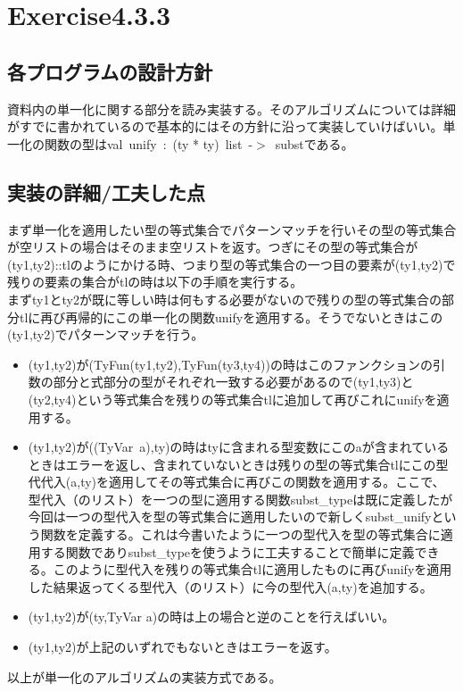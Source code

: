 \documentclass[a4paper,11pt,oneside,openany]{jsarticle}
\begin{document}
\section{Exercise4.3.3}
\subsection{各プログラムの設計方針}
  資料内の単一化に関する部分を読み実装する。そのアルゴリズムについては詳細がすでに書かれているので基本的にはその方針に沿って実装していけばいい。単一化の関数の型はval\ unify\ :\ (ty * ty)\ list\ -$>$\ substである。

\subsection{実装の詳細/工夫した点}
  まず単一化を適用したい型の等式集合でパターンマッチを行いその型の等式集合が空リストの場合はそのまま空リストを返す。つぎにその型の等式集合が(ty1,ty2)::tlのようにかける時、つまり型の等式集合の一つ目の要素が(ty1,ty2)で残りの要素の集合がtlの時は以下の手順を実行する。\\
  まずty1とty2が既に等しい時は何もする必要がないので残りの型の等式集合の部分tlに再び再帰的にこの単一化の関数unifyを適用する。そうでないときはこの(ty1,ty2)でパターンマッチを行う。
  \begin{itemize}
    \item(ty1,ty2)が(TyFun(ty1,ty2),TyFun(ty3,ty4))の時はこのファンクションの引数の部分と式部分の型がそれぞれ一致する必要があるので(ty1,ty3)と(ty2,ty4)という等式集合を残りの等式集合tlに追加して再びこれにunifyを適用する。
    \item(ty1,ty2)が((TyVar\ a),ty)の時はtyに含まれる型変数にこのaが含まれているときはエラーを返し、含まれていないときは残りの型の等式集合tlにこの型代代入(a,ty)を適用してその等式集合に再びこの関数を適用する。ここで、型代入（のリスト）を一つの型に適用する関数subst\_typeは既に定義したが今回は一つの型代入を型の等式集合に適用したいので新しくsubst\_unifyという関数を定義する。これは今書いたように一つの型代入を型の等式集合に適用する関数でありsubst\_typeを使うように工夫することで簡単に定義できる。このように型代入を残りの等式集合tlに適用したものに再びunifyを適用した結果返ってくる型代入（のリスト）に今の型代入(a,ty)を追加する。
    \item(ty1,ty2)が(ty,TyVar a)の時は上の場合と逆のことを行えばいい。
    \item(ty1,ty2)が上記のいずれでもないときはエラーを返す。
  \end{itemize}
  以上が単一化のアルゴリズムの実装方式である。
\\\\
\end{document}
